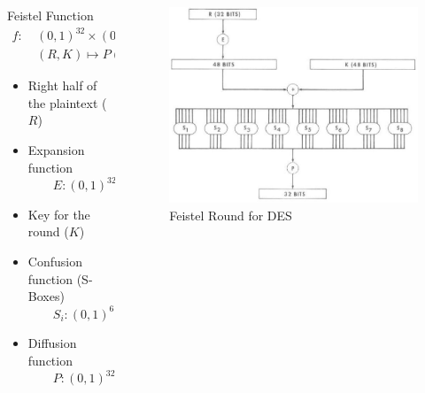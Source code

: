 \documentclass[9pt]{beamer}
\begin{document}
\begin{frame}
\begin{columns}
\begin{column}{0.45\textwidth}
\begin{block}{Feistel Function}
\begin{align*}
f : \: & (0,1)^{32} \times (0,1)^{48} \rightarrow (0,1)^{32} \\
& (R,K)  \mapsto P (S_{Box}(E(R) \oplus K)) 
\end{align*}
\end{block}

\vspace{0.2in}
\begin{itemize}
\item{Right half of the plaintext ($R$)}
\item{Expansion function \\ $\qquad E : (0,1)^{32} \rightarrow (0,1)^{48}$}
\item{Key for the round ($K$)}
\item{Confusion function (S-Boxes) \\ $\qquad S_i: (0,1)^6 \rightarrow (0,1)^4$}
\item{Diffusion function \\ $\qquad P : (0,1)^{32} \rightarrow (0,1)^{32}$}
\end{itemize}
\end{column}

\begin{column}{0.55\textwidth}
\begin{figure}
\includegraphics[totalheight=0.6\textheight]{des_feistel.jpg}
\caption{Feistel Round for DES}
\end{figure}
\end{column}
\end{columns}
\end{frame}
\end{document}
